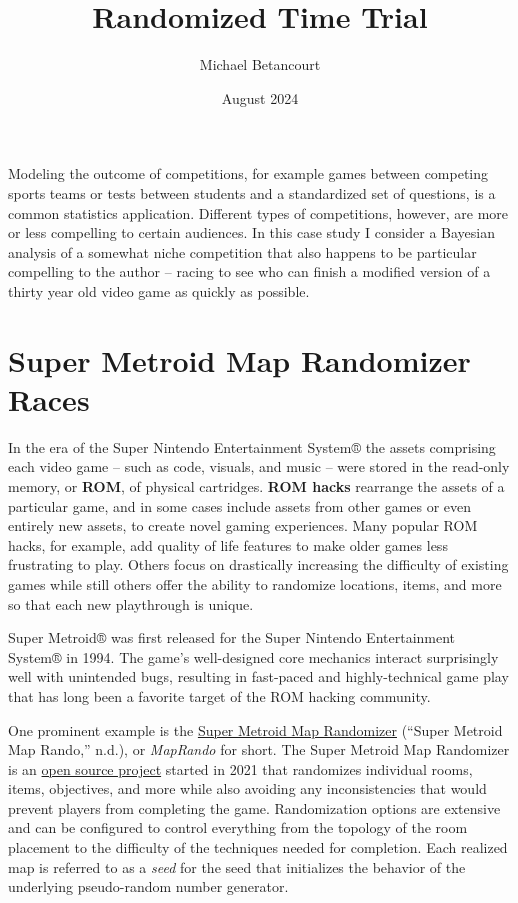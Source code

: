 \documentclass[
  letterpaper,
  DIV=11,
  numbers=noendperiod]{scrartcl}
\title{Randomized Time Trial}
\author{Michael Betancourt}
\date{August 2024}
\renewcommand*\contentsname{Table of contents}
\newcommand\contentsname{Table of contents}
\begin{document}
\maketitle

\renewcommand*\contentsname{Table of contents}
{
\hypersetup{linkcolor=}
\setcounter{tocdepth}{3}
\tableofcontents
}
Modeling the outcome of competitions, for example games between
competing sports teams or tests between students and a standardized set
of questions, is a common statistics application. Different types of
competitions, however, are more or less compelling to certain audiences.
In this case study I consider a Bayesian analysis of a somewhat niche
competition that also happens to be particular compelling to the author
-- racing to see who can finish a modified version of a thirty year old
video game as quickly as possible.

\section{Super Metroid Map Randomizer
Races}\label{super-metroid-map-randomizer-races}

In the era of the Super Nintendo Entertainment System® the assets
comprising each video game -- such as code, visuals, and music -- were
stored in the read-only memory, or \textbf{ROM}, of physical cartridges.
\textbf{ROM hacks} rearrange the assets of a particular game, and in
some cases include assets from other games or even entirely new assets,
to create novel gaming experiences. Many popular ROM hacks, for example,
add quality of life features to make older games less frustrating to
play. Others focus on drastically increasing the difficulty of existing
games while still others offer the ability to randomize locations,
items, and more so that each new playthrough is unique.

Super Metroid® was first released for the Super Nintendo Entertainment
System® in 1994. The game's well-designed core mechanics interact
surprisingly well with unintended bugs, resulting in fast-paced and
highly-technical game play that has long been a favorite target of the
ROM hacking community.

One prominent example is the \href{https://maprando.com}{Super Metroid
Map Randomizer} ({``Super Metroid Map Rando,''} n.d.), or
\emph{MapRando} for short. The Super Metroid Map Randomizer is an
\href{https://github.com/blkerby/MapRandomizer}{open source project}
started in 2021 that randomizes individual rooms, items, objectives, and
more while also avoiding any inconsistencies that would prevent players
from completing the game. Randomization options are extensive and can be
configured to control everything from the topology of the room placement
to the difficulty of the techniques needed for completion. Each realized
map is referred to as a \emph{seed} for the seed that initializes the
behavior of the underlying pseudo-random number generator.
\end{document}
